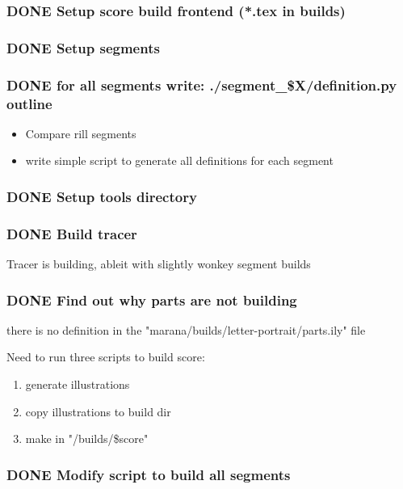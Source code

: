 \documentclass[11pt]{article}
\begin{document}
\subsubsection{{\bfseries\sffamily DONE} Setup score build frontend (*.tex in builds)}
\label{sec:org2bb4980}

\subsubsection{{\bfseries\sffamily DONE} Setup segments}
\label{sec:orga2d05ed}

\subsubsection{{\bfseries\sffamily DONE} for all segments write: ./segment\_\$X/definition.py outline}
\label{sec:orgb9ff4f0}
\begin{itemize}
\item Compare rill segments
\item write simple script to generate all definitions for each segment
\end{itemize}
\subsubsection{{\bfseries\sffamily DONE} Setup tools directory}
\label{sec:orgc8ccea2}

\subsubsection{{\bfseries\sffamily DONE} Build tracer}
\label{sec:org46d46b8}
Tracer is building, ableit with slightly wonkey segment builds

\subsubsection{{\bfseries\sffamily DONE} Find out why parts are not building}
\label{sec:org7c41a37}
there is no definition in the
"marana/builds/letter-portrait/parts.ily" file 

Need to run three scripts to build score: 
\begin{enumerate}
\item generate illustrations
\item copy illustrations to build dir
\item make in "/builds/\$score"
\end{enumerate}

\subsubsection{{\bfseries\sffamily DONE} Modify script to build all segments}
\label{sec:org03bbbdb}
\end{document}
